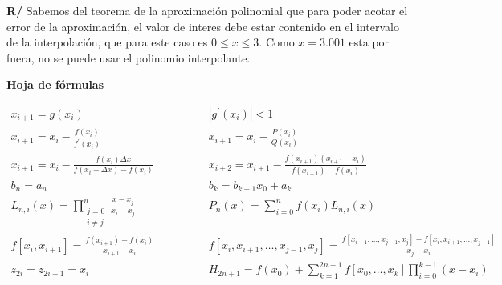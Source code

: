 \documentclass[12pt]{article}
\begin{document}
\begin{enumerate}[leftmargin=*,widest=9]
\begin{enumerate}[label=\alph*]
\textbf{R/} Sabemos del teorema de la aproximación polinomial que para poder acotar el error de la aproximación, el valor de interes debe estar contenido en el intervalo de la interpolación, que para este caso es \(0 \leq x \leq 3\). Como \(x=3.001\) esta por fuera, no se puede usar el polinomio interpolante.
   \end{enumerate}
  \end{enumerate}
\begin{center}
\textbf{Hoja de fórmulas}
\end{center}
{\large
\[
\begin{array}{cc}
x_{i+1} = g(x_i) \qquad & \qquad |g^\prime(x_i)| < 1 \\
x_{i+1} = x_i - \frac{f(x_i)}{f^\prime(x_i)} \qquad & \qquad x_{i+1} = x_i - \frac{P(x_i)}{Q(x_i)} \\
x_{i+1} = x_i - \frac{f(x_i) \Delta x}{f(x_i + \Delta x) - f(x_i)} \qquad & \qquad x_{i+2} = x_{i+1} - \frac{f(x_{i+1}) (x_{i+1}-x_i)}{f(x_{i+1}) - f(x_i)} \\
b_n = a_n \qquad & \qquad
b_k = b_{k+1}x_0 + a_k \\
L_{n, i}(x) = \prod\limits_{\substack{j=0\\ i \neq j}}^n \frac{x - x_j}{x_i - x_j} \qquad & \qquad
P_n(x) = \sum\limits_{i = 0}^n f(x_i)L_{n,i}(x) \\
f\left[x_i, x_{i+1}\right] = \frac{f(x_{i+1})-f(x_i)}{x_{i+1}-x_i} \qquad & \qquad
f\left[ x_i, x_{i+1}, \ldots, x_{j-1}, x_j\right] = \frac{f\left[x_{i+1}, \ldots, x_{j-1}, x_j\right] - f\left[ x_i, x_{i+1}, \ldots, x_{j-1} \right]}{x_j - x_i} \\
z_{2i} = z_{2i+1} = x_i \qquad & \qquad
H_{2n+1} = f(x_0) + \sum\limits_{k=1}^{2n+1} f\left[x_0, \ldots, x_k\right] \prod\limits_{i = 0}^{k-1}(x-x_i) %
\end{array}
\]
}
\end{document}
